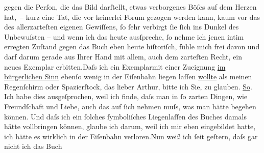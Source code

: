 \begin{ledgroupsized}[t]{13cm}
               gegen die Perſon, die das Bild darſtellt, etwas verborgenes Böſes auf dem Herzen
               hat, – kurz eine Tat, die vor keinerlei Forum gezogen werden kann, kaum vor das des
               allerzarteſten eigenen Gewiſſens, ſo ſehr verbirgt ſie{ }{\pb}ſich ins Dunkel des Unbewuſsten –
               und wenn ich das heute ausſpreche, ſo nehme ich jenen intim erregten Zuſtand gegen
               das Buch eben heute
               hiſtoriſch, fühle mich frei davon und darf darum gerade aus Ihrer Hand mit allem,
               auch dem zarteſten Recht, ein neues Exemplar erbitten.\hspace*{1.5em}Daſs ich ein Exemplarmit einer Zueignung \uline{im bürgerlichen Sinn} ebenſo wenig in der Eiſenbahn liegen
               laſſen \uline{wollte} als meinen Regenſchirm oder
               Spazierſtock, das lieber Arthur, bitte ich Sie, zu glauben.\pend
           \pstart
           \uline{So}. Ich habe dies ausgeſprochen, weil ich finde, daſs
               man in ſo zarten Dingen, wie Freundſchaft und Liebe, auch das auf ſich nehmen muſs,
               was man hätte begehen können. Und {\pb}daſs ich ein ſolches ſymboliſches Liegenlaſſen des Buches damals hätte vollbringen können,
               glaube ich darum, weil ich mir eben eingebildet hatte, ich hätte es wirklich in der
               Eiſenbahn verloren.\hspace*{1.5em}Nun weiß ich ſeit geſtern, daſs
               gar nicht ich das Buch

\end{ledgroupsized}
